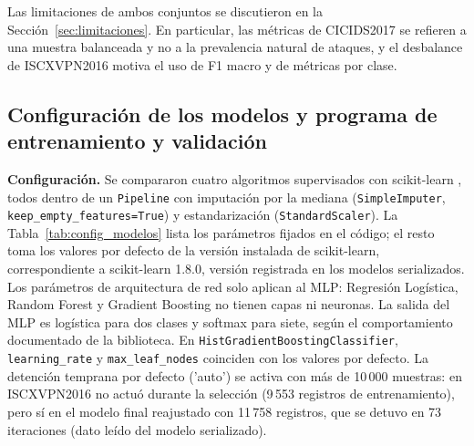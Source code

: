 \documentclass[conference]{IEEEtran}
\begin{document}
Las limitaciones de ambos conjuntos se discutieron en la Sección~\ref{sec:limitaciones}. En particular, las métricas de CICIDS2017 se refieren a una muestra balanceada y no a la prevalencia natural de ataques, y el desbalance de ISCXVPN2016 motiva el uso de F1 macro y de métricas por clase.

\subsection{Configuración de los modelos y programa de entrenamiento y validación}
\label{sec:res_config}

\textbf{Configuración.} Se compararon cuatro algoritmos supervisados con scikit-learn \cite{pedregosa2011}, todos dentro de un \texttt{Pipeline} con imputación por la mediana (\texttt{SimpleImputer}, \texttt{keep\_empty\_features=True}) y estandarización (\texttt{StandardScaler}). La Tabla~\ref{tab:config_modelos} lista los parámetros fijados en el código; el resto toma los valores por defecto de la versión instalada de scikit-learn, correspondiente a scikit-learn 1.8.0, versión registrada en los modelos serializados. Los parámetros de arquitectura de red solo aplican al MLP: Regresión Logística, Random Forest y Gradient Boosting no tienen capas ni neuronas. La salida del MLP es logística para dos clases y softmax para siete, según el comportamiento documentado de la biblioteca. En \texttt{HistGradientBoostingClassifier}, \texttt{learning\_rate} y \texttt{max\_leaf\_nodes} coinciden con los valores por defecto. La detención temprana por defecto ('auto') se activa con más de 10\,000 muestras: en ISCXVPN2016 no actuó durante la selección (9\,553 registros de entrenamiento), pero sí en el modelo final reajustado con 11\,758 registros, que se detuvo en 73 iteraciones (dato leído del modelo serializado).
\end{document}

